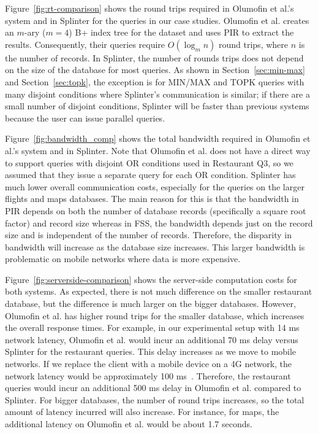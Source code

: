 Figure~\ref{fig:rt-comparison} shows 
the round trips required in Olumofin et al.'s system and in Splinter
for the queries in our case studies. Olumofin et al. creates
an $m$-ary ($m=4$) B+ index tree for the dataset and
uses PIR to extract the results. Consequently, their queries
require $O(\log_m n)$ round trips, where $n$ is
the number of records. In Splinter, the number of rounds trips
does not depend on the size of the database for most queries.
As shown in Section~\ref{sec:min-max} and Section~\ref{sec:topk}, 
the exception is for MIN/MAX and TOPK queries with many disjoint
conditions where Splinter's
communication is similar; if there are a small number of disjoint
conditions, Splinter will be faster than previous systems 
because the user can issue parallel queries.

Figure~\ref{fig:bandwidth_comp} shows the total bandwidth
required in Olumofin et al.'s system and in Splinter. Note that
Olumofin et al. does not have a direct way to support queries with
disjoint OR conditions used in Restaurant Q3, so we assumed that they issue a separate query
for each OR condition. Splinter has much lower overall communication
costs, especially for the queries on the larger flights and maps
databases. The main reason for this is that the bandwidth
in PIR depends on both the number of database records (specifically a square root factor) 
and record size whereas in FSS, the bandwidth depends just on the record size and is
independent of the number of records. Therefore, the disparity in bandwidth
will increase as the database size increases. This larger bandwidth
is problematic on mobile networks where data is more expensive.

Figure~\ref{fig:serverside-comparison} shows the server-side computation
costs for both systems. As expected, there is not much difference 
on the smaller restaurant database, but the difference is much larger
on the bigger databases. However, Olumofin et al. has higher round trips
for the smaller database, which increases the overall response times. For example,
in our experimental setup with 14 ms network latency, Olumofin et al. would 
incur an additional 70 ms delay versus Splinter for the restaurant queries. 
This delay increases as we move to mobile networks. If we replace
the client with a mobile device on a 4G network, the network latency
would be approximately 100 ms~\cite{mobile-delays}. Therefore,
the restaurant queries would incur an additional 500 ms delay in Olumofin et al.
compared to Splinter. For bigger databases, the number of round trips increases,
so the total amount of latency incurred will also increase. For instance,
for maps, the additional latency on Olumofin et al. would be about 1.7 seconds.

